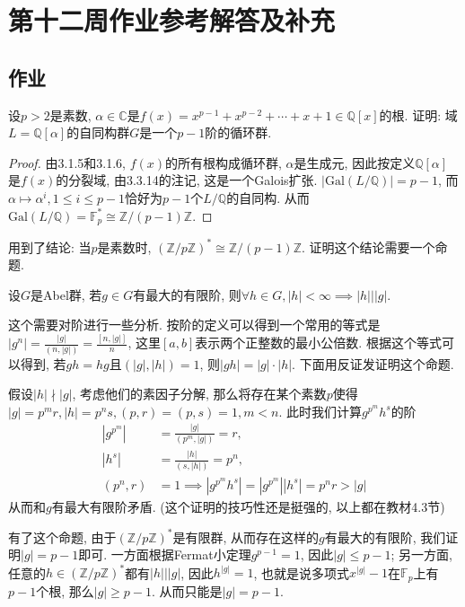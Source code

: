 \documentclass{../solutions-cn}
\begin{document}
\section*{第十二周作业参考解答及补充}

\subsection*{作业}

\begin{exercise}[习题3.4.1]
    设$p > 2$是素数, $\alpha \in \mathbb{C}$是$f(x) = x^{p - 1} + x^{p - 2} + \cdots + x + 1 \in \mathbb{Q}[x]$的根. 证明: 域$L = \mathbb{Q}[\alpha]$的自同构群$G$是一个$p - 1$阶的循环群.
\end{exercise}

\begin{proof}
    由3.1.5和3.1.6, $f(x)$的所有根构成循环群, $\alpha$是生成元, 因此按定义$\mathbb{Q}[\alpha]$是$f(x)$的分裂域, 由3.3.14的注记, 这是一个Galois扩张. $|\mathrm{Gal}(L/\mathbb{Q})| = p - 1$, 而$\alpha \mapsto \alpha^i, 1 \leqslant i \leqslant p - 1$恰好为$p - 1$个$L/\mathbb{Q}$的自同构. 从而$\mathrm{Gal}(L/\mathbb{Q}) = \mathbb{F}_p^* \cong \mathbb{Z}/(p - 1)\mathbb{Z}$.
\end{proof}

\begin{remark}
    用到了结论: 当$p$是素数时, $(\mathbb{Z}/p\mathbb{Z})^* \cong \mathbb{Z}/(p - 1)\mathbb{Z}$. 证明这个结论需要一个命题.
    \begin{propstar}
        设$G$是Abel群, 若$g \in G$有最大的有限阶, 则$\forall h \in G, |h| < \infty \implies |h| \Big| |g|$.
    \end{propstar}
    这个需要对阶进行一些分析. 按阶的定义可以得到一个常用的等式是$|g^n| = \frac{|g|}{(n, |g|)} = \frac{[n, |g|]}{n}$, 这里$[a, b]$表示两个正整数的最小公倍数. 根据这个等式可以得到, 若$gh = hg$且$(|g|, |h|) = 1$, 则$|gh| = |g| \cdot |h|$. 下面用反证发证明这个命题.
    
    假设$|h| \nmid |g|$, 考虑他们的素因子分解, 那么将存在某个素数$p$使得$|g| = p^mr, |h| = p^ns, (p, r) = (p, s) = 1, m < n$. 此时我们计算$g^{p^m}h^s$的阶
    \[
    \begin{aligned}
        |g^{p^m}| &= \frac{|g|}{(p^m, |g|)} = r,\\
        |h^s| &= \frac{|h|}{(s, |h|)} = p^n,\\
        (p^n, r) &= 1 \implies |g^{p^m}h^s| = |g^{p^m}||h^s| = p^nr > |g|
    \end{aligned}
    \]
    从而和$g$有最大有限阶矛盾. (这个证明的技巧性还是挺强的, 以上都在教材4.3节)

    有了这个命题, 由于$(\mathbb{Z}/p\mathbb{Z})^*$是有限群, 从而存在这样的$g$有最大的有限阶, 我们证明$|g| = p - 1$即可. 一方面根据Fermat小定理$g^{p - 1} = 1$, 因此$|g| \leqslant p - 1$; 另一方面, 任意的$h \in (\mathbb{Z}/p\mathbb{Z})^*$都有$|h| \Big| |g|$, 因此$h^{|g|} = 1$, 也就是说多项式$x^|g| - 1$在$\mathbb{F}_p$上有$p - 1$个根, 那么$|g| \geqslant p - 1$. 从而只能是$|g| = p - 1$.
\end{remark}
\end{document}
